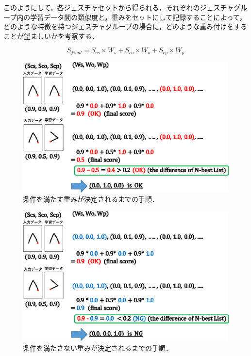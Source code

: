 このようにして，各ジェスチャセットから得られる，それぞれのジェスチャグループ内の学習データ間の類似度と，重みをセットにして記録することによって，どのような特徴を持つジェスチャグループの場合に，どのような重み付けをすることが望ましいかを考察する．

\begin{equation}
S_\textit{final} = S_\textit{cs} \times W_\textit{s} + S_\textit{co} \times W_\textit{o} + S_\textit{cp} \times W_\textit{p}
\end{equation}

\begin{figure} [h!]
	\begin{center}
		\includegraphics [width=0.8\hsize ]{img/weight_method2.eps}
	\end{center}
	\caption{条件を満たす重みが決定されるまでの手順．}
	\label{fig:weight_method1}
\end{figure}

\begin{figure} [h!]
	\begin{center}
		\includegraphics [width=0.8\hsize ]{img/weight_method1.eps}
	\end{center}
	\caption{条件を満たさない重みが決定されるまでの手順．}
	\label{fig:weight_method2}
\end{figure}

